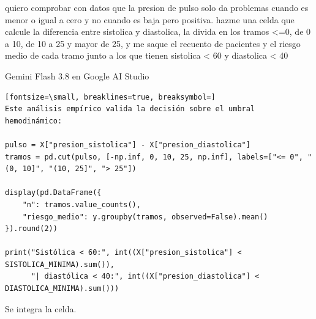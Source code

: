 \documentclass[12pt,a4paper,oneside]{book}
\begin{document}
\begin{iaprompt}
quiero comprobar con datos que la presion de pulso solo da problemas cuando es menor o igual a cero y no cuando es baja pero positiva. hazme una celda que calcule la diferencia entre sistolica y diastolica, la divida en los tramos <=0, de 0 a 10, de 10 a 25 y mayor de 25, y me saque el recuento de pacientes y el riesgo medio de cada tramo junto a los que tienen sistolica < 60 y diastolica < 40
\end{iaprompt}
\begin{iaresp}{Gemini Flash 3.8 en Google AI Studio}
\begin{Verbatim}[fontsize=\small, breaklines=true, breaksymbol=]
Este análisis empírico valida la decisión sobre el umbral hemodinámico:

pulso = X["presion_sistolica"] - X["presion_diastolica"]
tramos = pd.cut(pulso, [-np.inf, 0, 10, 25, np.inf], labels=["<= 0", "(0, 10]", "(10, 25]", "> 25"])

display(pd.DataFrame({
    "n": tramos.value_counts(), 
    "riesgo_medio": y.groupby(tramos, observed=False).mean()
}).round(2))

print("Sistólica < 60:", int((X["presion_sistolica"] < SISTOLICA_MINIMA).sum()),
      "| diastólica < 40:", int((X["presion_diastolica"] < DIASTOLICA_MINIMA).sum()))
\end{Verbatim}
\end{iaresp}
\begin{iaanalisis}
Se integra la celda. 
\end{iaanalisis}
\end{document}
